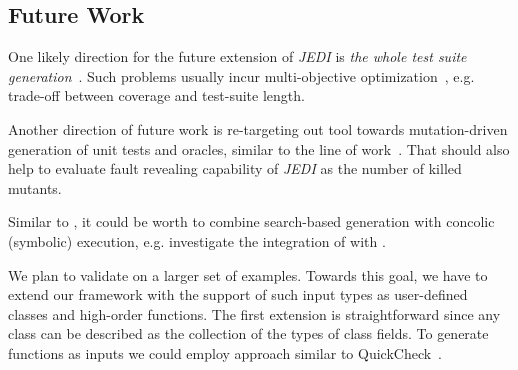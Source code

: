 
\subsection{Future Work}
\label{subsec.fut.work}

One likely direction for the future extension of \emph{JEDI} is \emph{the whole test suite generation}~\cite{fraser2013whole}. Such problems usually incur multi-objective optimization~\cite{lakhotia2007multi,panichella2017lips}, e.g. trade-off between coverage and test-suite length.

Another direction of future work is re-targeting out tool towards mutation-driven generation of unit tests and oracles, similar to the line of work~\cite{fraser2012mutation}. That should also help to evaluate fault revealing capability of \emph{JEDI} as the number of killed mutants.

Similar to \cite{baars2011symbolic, galeotti2013improving}, it could be worth to combine search-based generation with concolic (symbolic) execution, e.g. investigate the integration of \Jedi with \Jalangi.

We plan to validate \Jedi on a larger set of examples. Towards this goal, we have to extend our framework with the support of such input types as user-defined classes and high-order functions. The first extension is straightforward since any class can be described as the collection of the types of class fields. To generate functions as inputs we could employ approach similar to QuickCheck~\cite{koopman2006automatic}.


